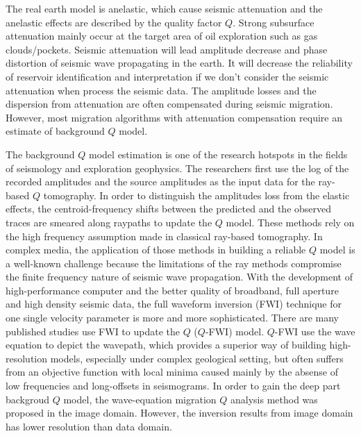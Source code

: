

\begin{englishabstract}

The real earth model is anelastic, which cause seismic attenuation and the 
anelastic effects are described by the quality factor $Q$. Strong subsurface attenuation 
mainly occur at the target area of oil exploration such as gas clouds/pockets. 
Seismic attenuation will lead amplitude decrease and phase distortion of seismic wave 
propagating in the earth. It will decrease the reliability of reservoir identification 
and interpretation if we don't consider the seismic attenuation when process the seismic 
data. The amplitude losses and the dispersion from attenuation are often compensated during 
seismic migration. However, most migration algorithms with attenuation compensation 
require an estimate of background $Q$ model.

The background $Q$ model estimation is one of the research hotspots in the fields of 
seismology and exploration geophysics. The researchers first use the log of the recorded 
amplitudes and the source amplitudes as the input data for the ray-based $Q$ tomography.
In order to distinguish the amplitudes loss from the elastic effects, the centroid-frequency 
shifts between the predicted and the observed traces are smeared along raypaths to update 
the $Q$ model. These methods rely on the high frequency assumption made in classical 
ray-based tomography. In complex media, the application of those
methods in building a reliable $Q$ model is a well-known challenge because the limitations 
of the ray methods compromise the finite frequency nature of seismic wave propagation.
With the development of high-performance computer and the better quality of broadband, full 
aperture and high density seismic data, the full waveform inversion (FWI) technique for 
one single velocity parameter is more and more sophisticated. There are many published 
studies use FWI to update the $Q$ ($Q$-FWI) model. $Q$-FWI use the wave equation to 
depict the wavepath, which provides a superior way of building high-resolution models, 
especially under complex geological setting, but often suffers from an objective 
function with local minima caused mainly by the absense of low frequencies and long-offsets 
in seismograms. In order to gain the deep part backgroud $Q$ model, the wave-equation 
migration $Q$ analysis method was proposed in the image domain. However, the inversion 
results from image domain has lower resolution than data domain.


\end{englishabstract}
